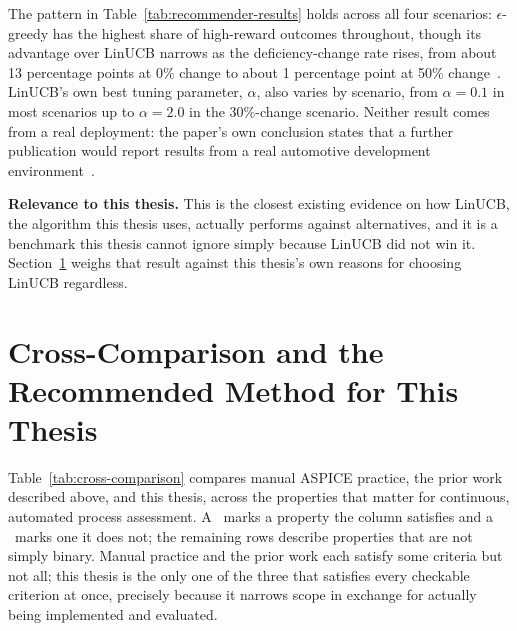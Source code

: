 \documentclass[a4paper, 12pt, oneside, openany, BCOR1cm,toc=chapterentrywithdots]{scrbook}
\newcommand{\cmark}{\textcolor{green!45!black}{\ding{51}}}
\newcommand{\xmark}{\textcolor{red!60!black}{\ding{55}}}
\begin{document}
The pattern in Table~\ref{tab:recommender-results} holds across all four scenarios:
$\epsilon$-greedy has the highest share of high-reward outcomes throughout, though its advantage
over LinUCB narrows as the deficiency-change rate rises, from about 13 percentage points at 0\%
change to about 1 percentage point at 50\% change~\cite{datsogiannis2025recommender}. LinUCB's own
best tuning parameter, $\alpha$, also varies by scenario, from $\alpha=0.1$ in most scenarios up
to $\alpha=2.0$ in the 30\%-change scenario. Neither result comes from a real deployment: the
paper's own conclusion states that a further publication would report results from a real
automotive development environment~\cite{datsogiannis2025recommender}.

\textbf{Relevance to this thesis.} This is the closest existing evidence on how LinUCB, the
algorithm this thesis uses, actually performs against alternatives, and it is a benchmark this
thesis cannot ignore simply because LinUCB did not win it. Section~\ref{sec:cross-comparison}
weighs that result against this thesis's own reasons for choosing LinUCB regardless.

\section{Cross-Comparison and the Recommended Method for This Thesis}
\label{sec:cross-comparison}

Table~\ref{tab:cross-comparison} compares manual ASPICE practice, the prior work described above,
and this thesis, across the properties that matter for continuous, automated process assessment.
A \cmark\ marks a property the column satisfies and a \xmark\ marks one it does not; the
remaining rows describe properties that are not simply binary. Manual practice and the prior work
each satisfy some criteria but not all; this thesis is the only one of the three that satisfies
every checkable criterion at once, precisely because it narrows scope in exchange for actually
being implemented and evaluated.
\end{document}
